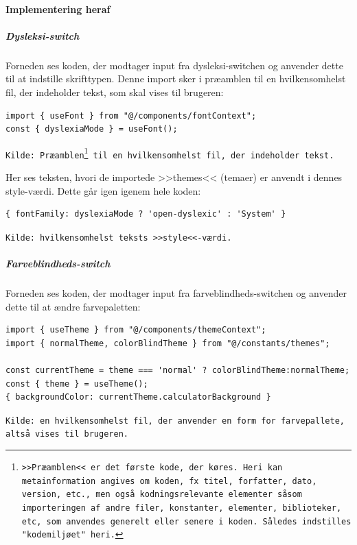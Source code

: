 \paragraph{Implementering heraf}
\subparagraph{Dysleksi-switch} Forneden ses koden, der modtager input fra dysleksi-switchen og anvender dette til at indstille skrifttypen. Denne import sker i præamblen til en hvilkensomhelst fil, der indeholder tekst, som skal vises til brugeren:
\begin{mdframed}[backgroundcolor=blue!5]
\begin{verbatim}
import { useFont } from "@/components/fontContext";
const { dyslexiaMode } = useFont();
\end{verbatim}
\end{mdframed}
\footnotesize\texttt{Kilde: Præamblen\footnote{>>Præamblen<< er det første kode, der køres. Heri kan metainformation angives om koden, fx titel, forfatter, dato, version, etc., men også kodningsrelevante elementer såsom importeringen af andre filer, konstanter, elementer, biblioteker, etc, som anvendes generelt eller senere i koden. Således indstilles "kodemiljøet" heri.} til en hvilkensomhelst fil, der indeholder tekst.}

Her ses teksten, hvori de importede >>themes<< (temaer) er anvendt i dennes style-værdi. Dette går igen igenem hele koden:
\begin{mdframed}[backgroundcolor=blue!5]
\begin{verbatim}
{ fontFamily: dyslexiaMode ? 'open-dyslexic' : 'System' }
\end{verbatim}
\end{mdframed}
\footnotesize\texttt{Kilde: hvilkensomhelst teksts >>style<<-værdi.}

\subparagraph{Farveblindheds-switch} Forneden ses koden, der modtager input fra farveblindheds-switchen og anvender dette til at ændre farvepaletten:
\begin{mdframed}[backgroundcolor=blue!5]
\begin{verbatim}
import { useTheme } from "@/components/themeContext";
import { normalTheme, colorBlindTheme } from "@/constants/themes";

const currentTheme = theme === 'normal' ? colorBlindTheme:normalTheme;
const { theme } = useTheme();
{ backgroundColor: currentTheme.calculatorBackground }
\end{verbatim}
\end{mdframed}
\footnotesize\texttt{Kilde: en hvilkensomhelst fil, der anvender en form for farvepallete, altså vises til brugeren.}

